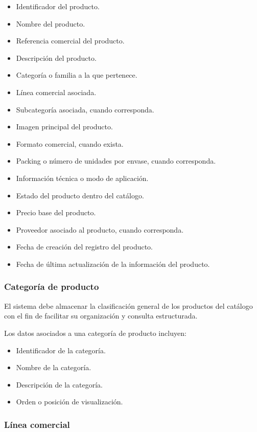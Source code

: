 \begin{itemize}
    \item Identificador del producto.
    \item Nombre del producto.
    \item Referencia comercial del producto.
    \item Descripción del producto.
    \item Categoría o familia a la que pertenece.
    \item Línea comercial asociada.
    \item Subcategoría asociada, cuando corresponda.
    \item Imagen principal del producto.
    \item Formato comercial, cuando exista.
    \item Packing o número de unidades por envase, cuando corresponda.
    \item Información técnica o modo de aplicación.
    \item Estado del producto dentro del catálogo.
    \item Precio base del producto.
    \item Proveedor asociado al producto, cuando corresponda.
    \item Fecha de creación del registro del producto.
    \item Fecha de última actualización de la información del producto.
\end{itemize}

\subsubsection*{Categoría de producto}

El sistema debe almacenar la clasificación general de los productos del catálogo con el fin de facilitar su organización y consulta estructurada.

Los datos asociados a una categoría de producto incluyen:

\begin{itemize}
    \item Identificador de la categoría.
    \item Nombre de la categoría.
    \item Descripción de la categoría.
    \item Orden o posición de visualización.
\end{itemize}

\subsubsection*{Línea comercial}

